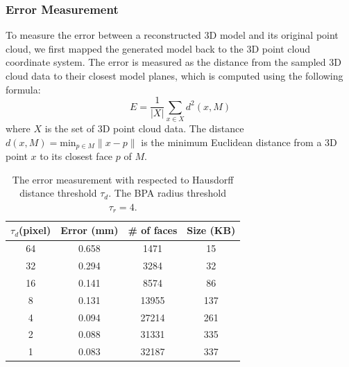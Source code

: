 \documentclass[12pt,letterpaper]{article}
\begin{document}
\subsubsection{Error Measurement}
To measure the error between a reconstructed 3D model and its original point cloud,
we first mapped the generated model back to the 3D point cloud coordinate system.
The error is measured as the distance from the sampled 3D cloud data to their closest model planes, which
is computed using the following formula:
\begin{equation}\label{eq_em}
E = \frac{1}{|X|}\sum_{x\in{X}}{d^2(x, M)}
\end{equation}
where $X$ is the set of 3D point cloud data. The distance
$d(x, M) = \text{min}_{p \in M}\lVert x - p \lVert$ is the minimum Euclidean distance from
a 3D point $x$ to its closest face $p$ of $M$.

\begin{table}[hbtp]
\centering
  \begin{tabular}[t]{||c||c|c|c||}
    \hline
    $\tau_{d} $(pixel) & Error (mm)& \# of faces & Size (KB) \\
    \hline \hline
    64 & 0.658 & 1471 & 15\\   %
    \hline		      %
    32 & 0.294 & 3284 & 32\\   %
    \hline		      %
    16 & 0.141 & 8574 & 86\\   %
    \hline		      %
    8 & 0.131 & 13955 & 137\\  %
    \hline		      %
    4 & 0.094 & 27214 & 261\\  %
    \hline		      %
    2 & 0.088 & 31331 & 335\\  %
    \hline		      %
    1 & 0.083 & 32187 & 337\\  %
    \hline
  \end{tabular}
\caption{
The error measurement with respected to Hausdorff distance threshold $\tau_d$.
The BPA radius threshold $\tau_r = 4$. }
\label{tbl_em}
\end{table}
\end{document}

